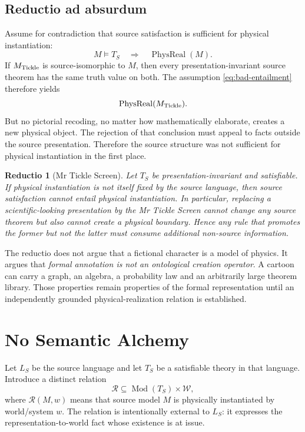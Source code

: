 \documentclass[10pt,a4paper]{article}
\newtheorem{reductio}[theorem]{Reductio}
\theoremstyle{definition}
\theoremstyle{remark}
\newcommand{\Mod}{\operatorname{Mod}}
\begin{document}
\subsection{Reductio ad absurdum}

Assume for contradiction that source satisfaction is sufficient for physical
instantiation:
\begin{equation}
\label{eq:bad-entailment}
M\models T_S
\quad\Longrightarrow\quad
\operatorname{PhysReal}(M).
\end{equation}
If \(M_{\rm Tickle}\) is source-isomorphic to \(M\), then every
presentation-invariant source theorem has the same truth value on both.  The
assumption \eqref{eq:bad-entailment} therefore yields
\[
\operatorname{PhysReal}(M_{\rm Tickle}).
\]
But no pictorial recoding, no matter how mathematically elaborate, creates a
new physical object.  The rejection of that conclusion must appeal to facts
outside the source presentation.  Therefore the source structure was not
sufficient for physical instantiation in the first place.

\begin{reductio}[Mr Tickle Screen]
Let \(T_S\) be presentation-invariant and satisfiable.  If physical
instantiation is not itself fixed by the source language, then source
satisfaction cannot entail physical instantiation.  In particular, replacing
a scientific-looking presentation by the Mr Tickle Screen cannot change any
source theorem but also cannot create a physical boundary.  Hence any rule
that promotes the former but not the latter must consume additional
non-source information.
\end{reductio}

\begin{warningbox}
The reductio does not argue that a fictional character is a model of physics.
It argues that \emph{formal annotation is not an ontological creation
operator}.  A cartoon can carry a graph, an algebra, a probability law and an
arbitrarily large theorem library.  Those properties remain properties of the
formal representation until an independently grounded physical-realization
relation is established.
\end{warningbox}

\section{No Semantic Alchemy}
\label{sec:alchemy}

Let \(L_S\) be the source language and let \(T_S\) be a satisfiable theory in
that language.  Introduce a distinct relation
\[
\mathcal R\subseteq \Mod(T_S)\times\mathcal W,
\]
where \(\mathcal R(M,w)\) means that source model \(M\) is physically
instantiated by world/system \(w\).  The relation is intentionally external to
\(L_S\): it expresses the representation-to-world fact whose existence is at
issue.
\end{document}
